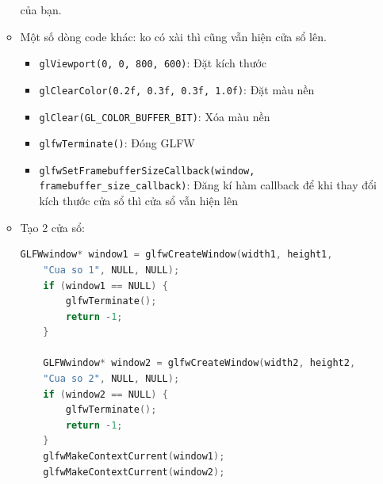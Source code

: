 \begin{enumerate}
\begin{itemize}
          của bạn.
        \item Một số dòng code khác: ko có xài thì cũng vẫn hiện cửa sổ lên.
        \begin{itemize}
            \item \texttt{glViewport(0, 0, 800, 600)}: Đặt kích thước
            \item   
            \texttt{glClearColor(0.2f, 0.3f, 0.3f, 1.0f)}: Đặt màu nền
            \item \texttt{glClear(GL\_COLOR\_BUFFER\_BIT)}: Xóa màu nền
            \item \texttt{glfwTerminate()}: Đóng GLFW
            \item \texttt{glfwSetFramebufferSizeCallback(window,
             framebuffer\_size\_callback)}: Đăng kí hàm callback 
                để khi thay đổi kích thước cửa sổ thì cửa sổ vẫn hiện lên
        \end{itemize}
        \item Tạo 2 cửa sổ: 
        \begin{lstlisting}[language=C++]
    GLFWwindow* window1 = glfwCreateWindow(width1, height1, 
    "Cua so 1", NULL, NULL);
    if (window1 == NULL) {
        glfwTerminate();
        return -1;
    }

    GLFWwindow* window2 = glfwCreateWindow(width2, height2, 
    "Cua so 2", NULL, NULL);
    if (window2 == NULL) {
        glfwTerminate();
        return -1;
    }
    glfwMakeContextCurrent(window1);
    glfwMakeContextCurrent(window2);


\end{lstlisting}
\end{itemize}
\end{enumerate}
